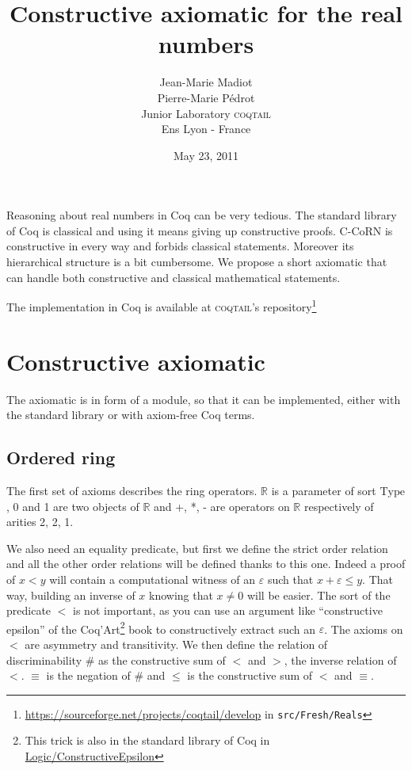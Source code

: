 \documentclass[a4paper,11pt]{article}
\newcommand{\R}{\mathbb{R}}
\newcommand{\Type}{\mbox{Type}}
\newcommand{\coqtail}{\textsc{coqtail}}
\theoremstyle{definition}
\theoremstyle{remark}
\begin{document}
\title{Constructive axiomatic for the real numbers}
\author{Jean-Marie Madiot \\ Pierre-Marie Pédrot \\ Junior Laboratory \coqtail{}\\ Ens Lyon - France\\}
\date{May 23, 2011}

\maketitle 

  Reasoning about real numbers in Coq can be very tedious. The standard library of Coq is classical and using it means giving up constructive proofs. C-CoRN is constructive in every way and forbids classical statements. Moreover its hierarchical structure is a bit cumbersome. We propose a short axiomatic that can handle both constructive and classical mathematical statements.

  The implementation in Coq is available at \coqtail's repository\footnote{\url{https://sourceforge.net/projects/coqtail/develop} in {\tt src/Fresh/Reals}}

\section{Constructive axiomatic}

  The axiomatic is in form of a module, so that it can be implemented, either with the standard library or with axiom-free Coq terms.

\subsection{Ordered ring}

  The first set of axioms describes the ring operators. $\R$ is a parameter of sort $\Type$, 0 and 1 are two objects of $\R$ and +, *, - are operators on $\R$ respectively of arities 2, 2, 1.

  We also need an equality predicate, but first we define the strict order relation and all the other order relations will be defined thanks to this one. Indeed a proof of $x<y$ will contain a computational witness of an $\varepsilon$ such that $x+\varepsilon≤y$. That way, building an inverse of $x$ knowing that $x\neq 0$ will be easier. The sort of the predicate $<$ is not important, as you can use an argument like ``constructive epsilon'' of the Coq'Art\cite{coqart}\footnote{This trick is also in the standard library of Coq in \href{http://coq.inria.fr/stdlib/Coq.Logic.ConstructiveEpsilon.html}{Logic/ConstructiveEpsilon}} book to constructively extract such an $\varepsilon$. The axioms on $<$ are asymmetry and transitivity. We then define the relation of discriminability $\#$ as the constructive sum of $<$ and $>$, the inverse relation of $<$. $≡$ is the negation of $\#$ and $≤$ is the constructive sum of $<$ and $≡$.
\end{document}
